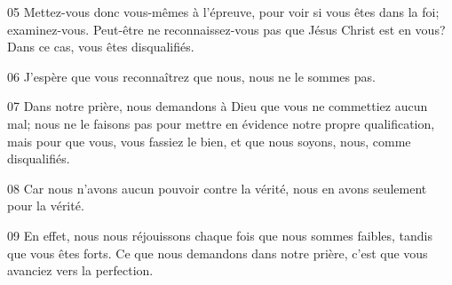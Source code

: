 
05 Mettez-vous donc vous-mêmes à l’épreuve, pour voir si vous êtes dans la foi; examinez-vous. Peut-être ne reconnaissez-vous pas que Jésus Christ est en vous? Dans ce cas, vous êtes disqualifiés.

06 J’espère que vous reconnaîtrez que nous, nous ne le sommes pas.

07 Dans notre prière, nous demandons à Dieu que vous ne commettiez aucun mal; nous ne le faisons pas pour mettre en évidence notre propre qualification, mais pour que vous, vous fassiez le bien, et que nous soyons, nous, comme disqualifiés.

08 Car nous n’avons aucun pouvoir contre la vérité, nous en avons seulement pour la vérité.

09 En effet, nous nous réjouissons chaque fois que nous sommes faibles, tandis que vous êtes forts. Ce que nous demandons dans notre prière, c’est que vous avanciez vers la perfection.
